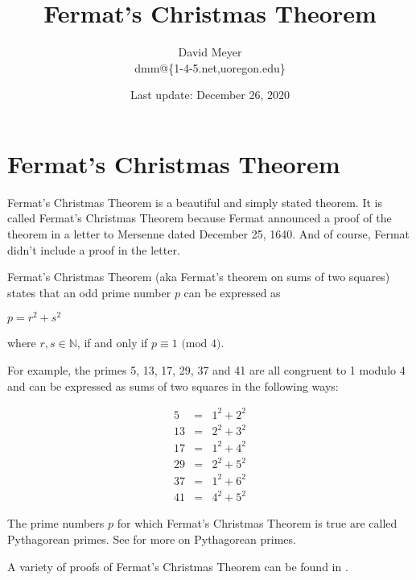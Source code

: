\documentclass[11pt, oneside]{article}   	%
\title{Fermat's Christmas Theorem}
\author{David Meyer \\ dmm@\{1-4-5.net,uoregon.edu\}}
\date{Last update: December 26, 2020}
\theoremstyle{definition}
\begin{document}
\maketitle

\section*{Fermat's Christmas Theorem}

\noindent
Fermat's Christmas Theorem \cite{wiki:christmas_theorem} is a beautiful and simply stated theorem. It is called Fermat's Christmas Theorem because Fermat announced 
a proof of the theorem in a letter to Mersenne dated December 25, 1640. And of course, Fermat didn't include a proof in the letter. 

\bigskip
\noindent
Fermat's Christmas Theorem (aka Fermat's theorem on sums of two squares) states that an odd prime number $p$ can be expressed as

\bigskip
\begin{center}
\scalebox{2.00} {$p = r^{2} + s^{2}$}
\end{center}
\bigskip

\noindent
where $r,s \in \mathbb{N}$, if and only if $p \equiv 1 \textrm{ (mod  $4$)}$.

\bigskip
\noindent
For example, the primes 5, 13, 17, 29, 37 and 41 are all congruent to 1 modulo 4 and can be expressed as sums of two squares in the following ways:

\begin{equation*}
\begin{array}{rcll} 
5   &=& 1^{2} + 2^{2}   \\
13 &=& 2^{2} + 3^{2}   \\
17 &=&1^{2}  + 4^{2}    \\
29 &=& 2^{2} + 5^{2}    \\
37 &=& 1^{2} + 6^{2}    \\
41 &=& 4^{2} + 5^{2}
\end{array}
\end{equation*}

\bigskip
\noindent
The prime numbers $p$ for which Fermat's Christmas Theorem is true are called Pythagorean primes. See \cite{wiki:pythagorean_primes} for more on Pythagorean primes.


\bigskip
\noindent
A variety of proofs of Fermat's Christmas Theorem can be found in \cite{wiki:christmas_theorem_proofs}.




\end{document}
